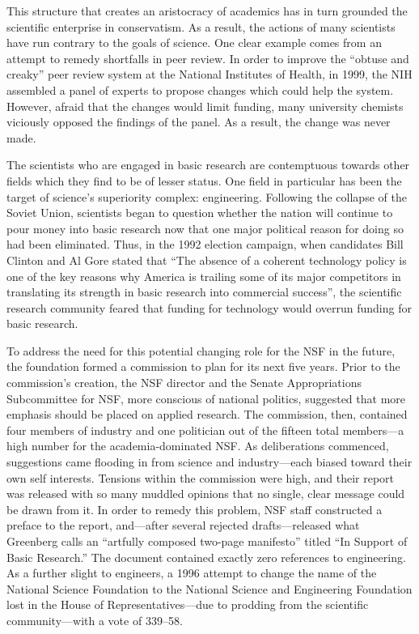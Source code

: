 \documentclass{article}[12pt]
\begin{document}
This structure that creates an aristocracy of academics has in turn grounded
the scientific enterprise in conservatism. As a result, the actions of many
scientists have run contrary to the goals of science. One clear example comes
from an attempt to remedy shortfalls in peer review. In order to improve the
``obtuse and creaky'' peer review system at the National Institutes of Health,
in 1999, the NIH assembled a panel of experts to propose changes which could
help the system. However, afraid that the changes would limit funding, many
university chemists viciously opposed the findings of the panel. As a result,
the change was never made.

The scientists who are engaged in basic research are contemptuous towards other
fields which they find to be of lesser status. One field in particular has been
the target of science's superiority complex: engineering. Following the
collapse of the Soviet Union, scientists began to question whether the nation
will continue to pour money into basic research now that one major political
reason for doing so had been eliminated. Thus, in the 1992 election campaign,
when candidates Bill Clinton and Al Gore stated that ``The absence of a
coherent technology policy is one of the key reasons why America is trailing
some of its major competitors in translating its strength in basic research
into commercial success'', the scientific research community
feared that funding for technology would overrun funding for basic research. 

To address the need for this potential changing role for the NSF in the future,
the foundation formed a commission to plan for its next five years. Prior to
the commission's creation, the NSF director and the Senate Appropriations
Subcommittee for NSF, more conscious of national politics, suggested that more
emphasis should be placed on applied research. The
commission, then, contained four members of industry and one politician out of
the fifteen total members---a high number for the academia-dominated
NSF. As deliberations commenced, suggestions came flooding in
from science and industry---each biased toward their own self
interests. Tensions within the commission were high, and their
report was released with so many muddled opinions that no single, clear message
could be drawn from it. In order to remedy this problem,
NSF staff constructed a preface to the report, and---after several rejected
drafts---released what Greenberg calls an ``artfully composed two-page
manifesto'' titled ``In Support of Basic Research.'' The
document contained exactly zero references to engineering. As a
further slight to engineers, a 1996 attempt to change the name of the National
Science Foundation to the National Science and Engineering Foundation lost in
the House of Representatives---due to prodding from the scientific
community---with a vote of 339--58.
\end{document}
